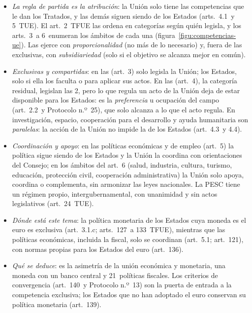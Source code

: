 \documentclass[11pt]{article}
\begin{document}
\begin{itemize}
\item \emph{La regla de partida es la atribución}: la Unión solo tiene las competencias que le dan los Tratados, y las demás siguen siendo de los Estados (arts.~4.1~y 5~TUE). El art.~2~TFUE las ordena en categorías según quién legisla, y los arts.~3~a 6~enumeran los ámbitos de cada una (figura~\ref{figu:competencias-ue}). Las ejerce con \emph{proporcionalidad} (no más de lo necesario) y, fuera de las exclusivas, con \emph{subsidiariedad} (solo si el objetivo se alcanza mejor en común).
\item \emph{Exclusivas y compartidas}: en las  (art.~3) solo legisla la Unión; los Estados, solo si ella los faculta o para aplicar sus actos. En las  (art.~4), la categoría residual, legislan las 2, pero lo que regula un acto de la Unión deja de estar disponible para los Estados: es la \emph{preferencia} u ocupación del campo (art.~2.2~y Protocolo n.º~25), que solo alcanza a lo que el acto regula. En investigación, espacio, cooperación para el desarrollo y ayuda humanitaria son \emph{paralelas}: la acción de la Unión no impide la de los Estados (art.~4.3~y 4.4).
\item \emph{Coordinación y apoyo}: en las políticas económicas y de empleo (art.~5) la política sigue siendo de los Estados y la Unión la coordina con orientaciones del Consejo; en los ámbitos del art.~6 (salud, industria, cultura, turismo, educación, protección civil, cooperación administrativa) la Unión solo apoya, coordina o complementa, sin armonizar las leyes nacionales. La PESC tiene un régimen propio, intergubernamental, con unanimidad y sin actos legislativos (art.~24~TUE).
\item \emph{Dónde está este tema}: la política monetaria de los Estados cuya moneda es el euro es exclusiva (art.~3.1.c; arts.~127~a 133~TFUE), mientras que las políticas económicas, incluida la fiscal, solo se coordinan (art.~5.1; art.~121), con normas propias para los Estados del euro (art.~136).
\item \emph{Qué se deduce}: es la asimetría de la unión económica y monetaria, una moneda con un banco central y 21~políticas fiscales. Los criterios de convergencia (art.~140~y Protocolo n.º~13) son la puerta de entrada a la competencia exclusiva; los Estados que no han adoptado el euro conservan su política monetaria (art.~139).
\end{itemize}

\begin{infografia}[H]
\centering
\caption{El reparto de competencias de la Unión (arts.~2~a 6~TFUE): la política monetaria y la coordinación económica}\label{figu:competencias-ue}
\end{infografia}
\end{document}
